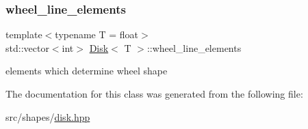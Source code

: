 \subsubsection{\texorpdfstring{wheel\+\_\+line\+\_\+elements}{wheel\_line\_elements}}
{\footnotesize\ttfamily template$<$typename T  = float$>$ \\
std\+::vector$<$int$>$ \mbox{\hyperlink{classDisk}{Disk}}$<$ T $>$\+::wheel\+\_\+line\+\_\+elements\hspace{0.3cm}{\ttfamily [private]}}

elements which determine wheel shape 

The documentation for this class was generated from the following file\+:\begin{DoxyCompactItemize}
\item 
src/shapes/\mbox{\hyperlink{disk_8hpp}{disk.\+hpp}}\end{DoxyCompactItemize}
